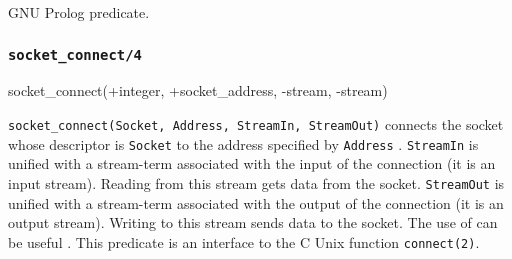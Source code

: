 \Portability

GNU Prolog predicate.

\subsubsection{\texttt{socket\_connect/4}}
\label{socket-connect/4}

\begin{TemplatesOneCol}
socket\_connect(+integer, +socket\_address, -stream, -stream)

\end{TemplatesOneCol}

\Description

\texttt{socket\_connect(Socket, Address, StreamIn, StreamOut)} connects the
socket whose descriptor is \texttt{Socket} to the address specified by
\texttt{Address} . \texttt{StreamIn} is
unified with a stream-term associated with the input of the connection (it is
an input stream). Reading from this stream gets data from the socket.
\texttt{StreamOut} is unified with a stream-term associated with the output of
the connection (it is an output stream). Writing to this stream sends data
to the socket. The use of  can be useful
. This predicate is an interface to the C Unix function
\texttt{connect(2)}.

